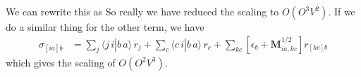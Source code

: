 We can rewrite this as
So really we have reduced the scaling to $O(O^3V^2)$. If we do a similar thing for the other term, we have
\begin{align}
\sigma_{[ia]b} &= 
    \sum_{j} \bigl\langle j\,i | b\,a \bigr\rangle\,r_j
    + \sum_{c} \bigl\langle c\,i | b\,a \bigr\rangle\,r_c
    + \sum_{kc} \left[\epsilon_b + \bm{M}^{1/2}_{ia,kc}\right] r_{[kc] b}
\end{align}
which gives the scaling of $O(O^2V^3)$.

